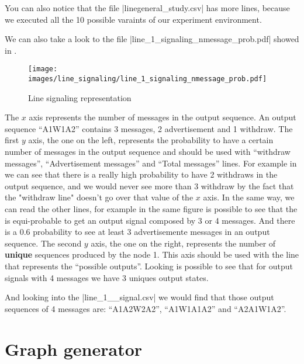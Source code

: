 \documentclass[10pt,journal,onecolumn]{IEEEtran}
\newcommand{\q}[1]{``#1''}
\begin{document}
You can also notice that the file |linegeneral_study.csv| has more lines, because
we executed all the \num{10} possible varaints of our experiment environment.

We can also take a look to the file |line_1_signaling_nmessage_prob.pdf| showed
in .
\begin{figure}[H]
    \centering
    \texttt{[image: images/line\_signaling/line\_1\_signaling\_nmessage\_prob.pdf]}
	\caption{Line signaling representation}
    \label{fig:line_singaling}
\end{figure}

The $x$ axis represents the number of messages in the output sequence.            
An output sequence \q{A1W1A2} contains \num{3} messages, \num{2} advertisement and
\num{1} withdraw.
The first $y$ axis, the one on the left, represents the probability to have a certain
number of messages in the output sequence and should be used with \q{withdraw     
messages}, \q{Advertisement messages} and \q{Total messages} lines.                 
For example in  we can see that there is a really
high probability to have \num{2} withdraws in the output sequence, and we would never
see more than \num{3} withdraw by the fact that the "withdraw line" doesn't go over that
value of the $x$ axis.                                                          
In the same way, we can read the other lines, for example in the same figure is 
possible to see that the is equi-probable to get an output signal composed by 
\num{3} or \num{4} messages.
And there is a \num{0.6} probability to see at least \num{3} advertisemente
messages in an output sequence.
The second $y$ axis, the one on the right, represents the number of \textbf{unique}
sequences produced by the node \num{1}.                                                                         
This axis should be used with the line that represents the \q{possible outputs}.  
Looking  is possible to see that for       
output signals with \num{4} messages we have \num{3} uniques output  
states. 

And looking into the |line_1__signal.csv| we would find that those output sequences
of \num{4} messages are: \q{A1A2W2A2}, \q{A1W1A1A2} and \q{A2A1W1A2}.

\section{Graph generator}
\label{sec:graph_generator}
\end{document}
